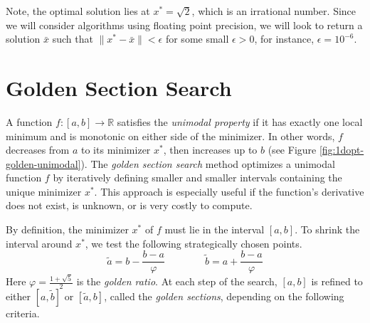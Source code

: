 Note, the optimal solution lies at $x^* = \sqrt{2}$, which is an irrational number.  Since we will consider algorithms using floating point precision, we will look to return a solution $\bar x$ such that $\|x^* - \bar x\| < \epsilon$ for some small $\epsilon > 0$, for instance, $\epsilon = 10^{-6}$.


\section*{Golden Section Search} %

A function $f:[a,b]\rightarrow\mathbb{R}$ satisfies the \emph{unimodal property} if it has exactly one local minimum and is monotonic on either side of the minimizer.
In other words, $f$ decreases from $a$ to its minimizer $x^*$, then increases up to $b$ (see Figure \ref{fig:1dopt-golden-unimodal}).
The \emph{golden section search} method optimizes a unimodal function $f$ by iteratively defining smaller and smaller intervals containing the unique minimizer $x^*$.
This approach is especially useful if the function's derivative does not exist, is unknown, or is very costly to compute.

By definition, the minimizer $x^*$ of $f$ must lie in the interval $[a,b]$.
To shrink the interval around $x^*$, we test the following strategically chosen points.
\begin{equation*}
\tilde{a} = b - \frac{b - a}{\varphi}\qquad\qquad
\tilde{b} = a + \frac{b - a}{\varphi}
\end{equation*}
Here $\varphi = \frac{1 + \sqrt{5}}{2}$ is the \emph{golden ratio}.
At each step of the search, $[a,b]$ is refined to either $[a,\tilde{b}]$ or $[\tilde{a}, b]$, called the \emph{golden sections}, depending on the following criteria.

